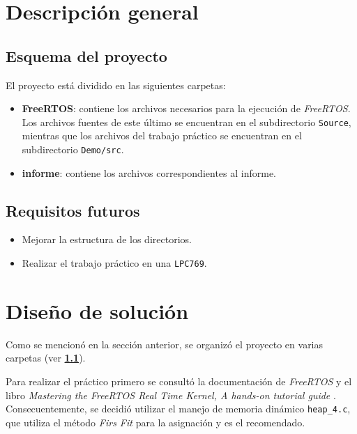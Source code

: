 \documentclass[12pt,a4paper]{article}
\begin{document}
\section{Descripción general}
\label{desc}

\subsection{Esquema del proyecto}
\label{esq}

El proyecto está dividido en las siguientes carpetas:

\begin{itemize}[leftmargin=1.5cm]
  \item \textbf{FreeRTOS}: contiene los archivos necesarios para la ejecución
  de \emph{FreeRTOS}. Los archivos fuentes de este último se encuentran en el
  subdirectorio \verb|Source|, mientras que los archivos del trabajo práctico
  se encuentran en el subdirectorio \verb|Demo/src|.

  \item \textbf{informe}: contiene los archivos correspondientes al informe.
\end{itemize}

\subsection{Requisitos futuros}
\label{futurereq}

\begin{itemize}[leftmargin=1.5cm]
  \item Mejorar la estructura de los directorios.
  \item Realizar el trabajo práctico en una \verb|LPC769|.
\end{itemize}

\newpage
\section{Diseño de solución}
\label{solucion}
Como se mencionó en la sección anterior, se organizó el proyecto en varias
carpetas (ver \textbf{\ref{esq}}).

Para realizar el práctico primero se consultó la documentación de \emph{FreeRTOS}
\cite{freedoc} y el libro \emph{Mastering the FreeRTOS Real Time Kernel,
A hands-on tutorial guide} \cite{freebook}. Consecuentemente, se decidió
utilizar el manejo de memoria dinámico \verb|heap_4.c|\cite{heap4}, que utiliza
el método \emph{Firs Fit} para la asignación y es el recomendado.
\end{document}
